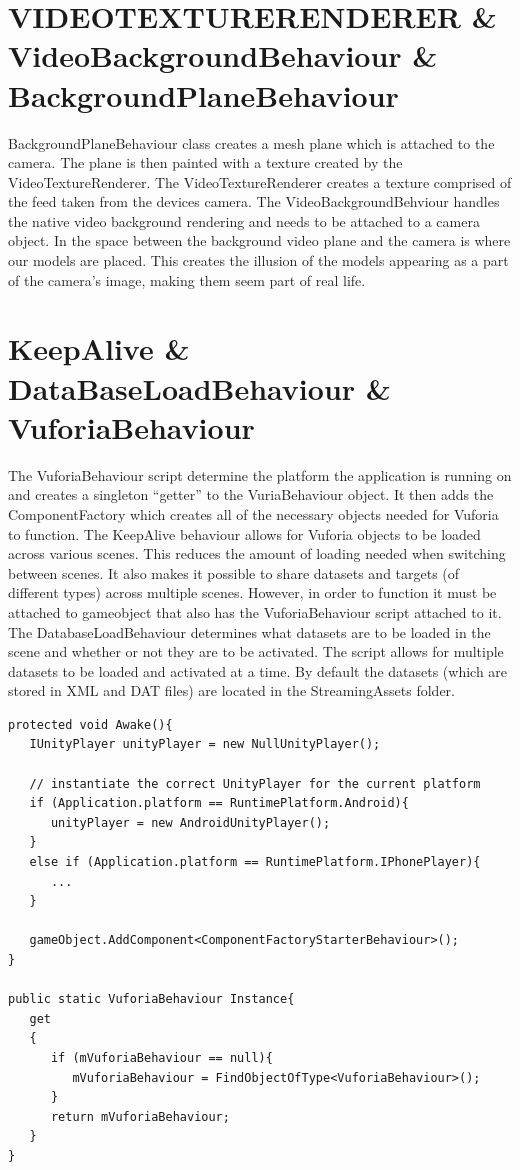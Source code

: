 \section{VIDEOTEXTURERENDERER \& VideoBackgroundBehaviour \& BackgroundPlaneBehaviour}
BackgroundPlaneBehaviour class creates a mesh plane which is attached to the camera. The plane is then painted with a texture created by the VideoTextureRenderer. The VideoTextureRenderer creates a texture comprised of the feed taken from the devices camera. The VideoBackgroundBehviour handles the native video background rendering and needs to be attached to a camera object.
In the space between the background video plane and the camera is where our models are placed. This creates the illusion of the models appearing as a part of the camera's image, making them seem part of real life.

\section{KeepAlive \& DataBaseLoadBehaviour \& VuforiaBehaviour}
The VuforiaBehaviour script determine the platform the application is running on and creates a singleton “getter” to the VuriaBehaviour object. It then adds the ComponentFactory which creates all of the necessary objects needed for Vuforia to function.   
The KeepAlive behaviour allows for Vuforia objects to be loaded across various scenes. This reduces the amount of loading needed when switching between scenes. It also makes it possible to share datasets and targets (of different types) across multiple scenes. However, in order to function it must be attached to gameobject that also has the VuforiaBehaviour script attached to it. The DatabaseLoadBehaviour determines what datasets are to be loaded in the scene and whether or not they are to be activated. The script allows for multiple datasets to be loaded and activated at a time. By default the datasets (which are stored in XML and DAT files) are located in the StreamingAssets folder.

\begin{lstlisting}
protected void Awake(){
   IUnityPlayer unityPlayer = new NullUnityPlayer();
   
   // instantiate the correct UnityPlayer for the current platform
   if (Application.platform == RuntimePlatform.Android){
      unityPlayer = new AndroidUnityPlayer();
   }
   else if (Application.platform == RuntimePlatform.IPhonePlayer){
      ...
   }
   
   gameObject.AddComponent<ComponentFactoryStarterBehaviour>();
}
   
public static VuforiaBehaviour Instance{
   get
   {
      if (mVuforiaBehaviour == null){
         mVuforiaBehaviour = FindObjectOfType<VuforiaBehaviour>();
      }
      return mVuforiaBehaviour;
   }
}
\end{lstlisting}

